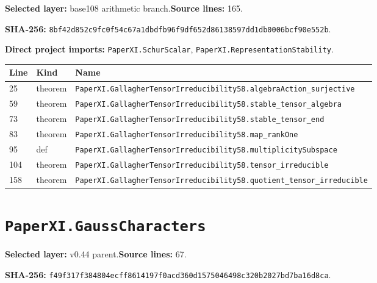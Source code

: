 \documentclass[10pt,oneside]{book}
\begin{document}
\textbf{Selected layer:} base108 arithmetic branch.\quad\textbf{Source lines:} 165.\par\textbf{SHA-256:} {\scriptsize\nolinkurl{8bf42d852c9fc0f54c67a1dbdfb96f9df652d86138597dd1db0006bcf90e552b}}.


\textbf{Direct project imports:} \nolinkurl{PaperXI.SchurScalar}, \nolinkurl{PaperXI.RepresentationStability}.

\begin{longtable}{@{}p{}p{}p{}@{}}\toprule Line&Kind&Name\\\midrule\endhead

25&theorem&\nolinkurl{PaperXI.GallagherTensorIrreducibility58.algebraAction_surjective}\\

59&theorem&\nolinkurl{PaperXI.GallagherTensorIrreducibility58.stable_tensor_algebra}\\

73&theorem&\nolinkurl{PaperXI.GallagherTensorIrreducibility58.stable_tensor_end}\\

83&theorem&\nolinkurl{PaperXI.GallagherTensorIrreducibility58.map_rankOne}\\

95&def&\nolinkurl{PaperXI.GallagherTensorIrreducibility58.multiplicitySubspace}\\

104&theorem&\nolinkurl{PaperXI.GallagherTensorIrreducibility58.tensor_irreducible}\\

158&theorem&\nolinkurl{PaperXI.GallagherTensorIrreducibility58.quotient_tensor_irreducible}\\

\bottomrule\end{longtable}

\section{\texorpdfstring{\nolinkurl{PaperXI.GaussCharacters}}{PaperXI.GaussCharacters}}\label{module:PaperXI.GaussCharacters}

\textbf{Selected layer:} v0.44 parent.\quad\textbf{Source lines:} 67.\par\textbf{SHA-256:} {\scriptsize\nolinkurl{f49f317f384804ecff8614197f0acd360d1575046498c320b2027bd7ba16d8ca}}.
\end{document}
